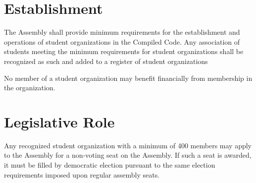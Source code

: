 \section{Establishment }
   The Assembly shall provide minimum requirements for the establishment and operations of student organizations in the Compiled Code. Any association of students meeting the minimum requirements for student organizations shall be recognized as such and added to a register of student organizations

   No member of a student organization may benefit financially from membership in the organization.

\section{Legislative Role}
    Any recognized student organization with a minimum of 400 members may apply to the Assembly for a non-voting seat on the Assembly. If such a seat is awarded, it must be filled by democratic election pursuant to the same election requirements imposed upon regular assembly seats.